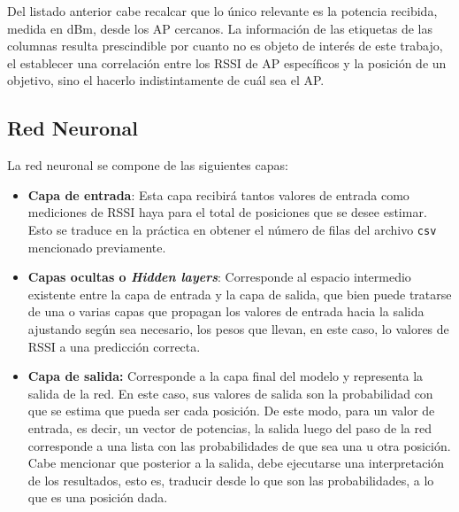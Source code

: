 Del listado anterior cabe recalcar que lo único relevante es la potencia recibida, medida en dBm, desde los AP cercanos. La información de las etiquetas de las columnas resulta prescindible por cuanto no es objeto de interés de este trabajo, el establecer una correlación entre los RSSI de AP específicos y la posición de un objetivo, sino el hacerlo indistintamente de cuál sea el AP.

\newpage

\subsection{Red Neuronal}

La red neuronal se compone de las siguientes capas:

\begin{itemize}
    \item \textbf{Capa de entrada}: Esta capa recibirá tantos valores de entrada como mediciones de RSSI haya para el total de posiciones que se desee estimar. Esto se traduce en la práctica en obtener el número de filas del archivo \texttt{csv} mencionado previamente.
    
    \item{\textbf{Capas ocultas o \textit{Hidden layers}}: Corresponde al espacio intermedio existente entre la capa de entrada y la capa de salida, que bien puede tratarse de una o varias capas que propagan los valores de entrada hacia la salida ajustando según sea necesario, los pesos que llevan, en este caso, lo valores de RSSI a una predicción correcta.}
    
    \item{\textbf{Capa de salida:} Corresponde a la capa final del modelo y representa la salida de la red. En este caso, sus valores de salida son la probabilidad con que se estima que pueda ser cada posición. De este modo, para un valor de entrada, es decir, un vector de potencias, la salida luego del paso de la red corresponde a una lista con las probabilidades de que sea una u otra posición. Cabe mencionar que posterior a la salida, debe ejecutarse una interpretación de los resultados, esto es, traducir desde lo que son las probabilidades, a lo que es una posición dada.}
\end{itemize}

